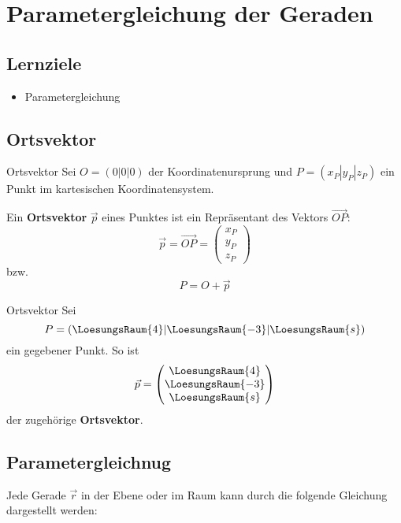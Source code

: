 \section{Parametergleichung der Geraden}

\subsection*{Lernziele}
\begin{itemize}
\item Parametergleichung
\end{itemize}

\newpage
\subsection{Ortsvektor}

\begin{definition}{Ortsvektor}{}
  Sei $O=(0|0|0)$ der Koordinatenursprung und $P=(x_P|y_P|z_P)$ ein Punkt im
  kartesischen Koordinatensystem.
  
  Ein \textbf{Ortsvektor} $\vec{p}$ eines Punktes
  ist ein Repräsentant des Vektors $\overrightarrow{OP}$:
  $$\vec{p} = \overrightarrow{OP}=\begin{pmatrix}x_P\\y_P\\z_P\end{pmatrix}$$
  bzw.
  $$P = O + \vec{p}$$
\end{definition}

\begin{beispiel}{Ortsvektor}{}
  Sei
  $$P=(\LoesungsRaum{4}|\LoesungsRaum{-3}|\LoesungsRaum{s})$$
  ein
gegebener Punkt. So ist
 $$\vec{p}
= \begin{pmatrix}\LoesungsRaum{4}\\\LoesungsRaum{-3}\\\LoesungsRaum{s}\end{pmatrix}$$
der zugehörige \textbf{Ortsvektor}.
\end{beispiel}

\newpage
\subsection{Parametergleichnug}
Jede Gerade $\vec{r}$ in der Ebene oder im Raum kann durch die
folgende Gleichung dargestellt werden:

